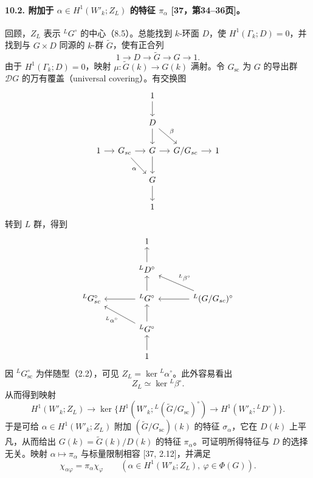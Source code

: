 \paragraph*{10.2. 附加于 $\alpha\in H^1(W'_k;Z_L)$ 的特征 $\pi_\alpha$ [37，第34--36页]。}
回顾，$Z_L$ 表示 ${}^LG^\circ$ 的中心（8.5）。总能找到 $k$-环面 $D$，使 $H^1(\Gamma_k;D)=0$，并找到与 $G\times D$ 同源的 $k$-群 $\widetilde G$，使有正合列
\begin{equation}
 1\longrightarrow D\longrightarrow\widetilde G\longrightarrow G\longrightarrow1.\tag{1}
\end{equation}
由于 $H^1(\Gamma_k;D)=0$，映射 $\mu:\widetilde G(k)\to G(k)$ 满射。令 $G_{\mathrm{sc}}$ 为 $G$ 的导出群 $\mathcal DG$ 的万有覆盖（universal covering）。有交换图
\[
\begin{tikzcd}[column sep=small]
 &&1\arrow[d]&&\\
 &&D\arrow[d]\arrow[dr,"\beta"]&&\\
 1\arrow[r]&G_{\mathrm{sc}}\arrow[r]\arrow[dr,"\alpha"']&\widetilde G\arrow[r]\arrow[d]&\widetilde G/G_{\mathrm{sc}}\arrow[r]&1\\
 &&G\arrow[d]&&\\
 &&1&&
\end{tikzcd}
\]
转到 $L$ 群，得到
\[
\begin{tikzcd}[column sep=large]
 &1&\\
 &{}^LD^\circ\arrow[u]&\\
 {}^LG_{\mathrm{sc}}^\circ&{}^L\widetilde G^\circ\arrow[l]\arrow[u]&{}^L(\widetilde G/G_{\mathrm{sc}})^\circ\arrow[l]\arrow[ul,"{}^L\beta^\circ"']\\
 &{}^LG^\circ\arrow[u]\arrow[ul,"{}^L\alpha^\circ"]&\\
 &1\arrow[u]&
\end{tikzcd}
\]
因 ${}^LG_{\mathrm{sc}}^\circ$ 为伴随型（2.2），可见 $Z_L=\ker{}^L\alpha^\circ$。此外容易看出
\begin{equation}
 Z_L\simeq\ker{}^L\beta^\circ.\tag{2}
\end{equation}
从而得到映射
\begin{equation}
 H^1(W'_k;Z_L)\longrightarrow
 \ker\{H^1(W'_k;{}^L(\widetilde G/G_{\mathrm{sc}})^\circ)
 \longrightarrow H^1(W'_k;{}^LD^\circ)\}.\tag{3}
\end{equation}
于是可给 $\alpha\in H^1(W'_k;Z_L)$ 附加 $(\widetilde G/G_{\mathrm{sc}})(k)$ 的特征 $\sigma_\alpha$，它在 $D(k)$ 上平凡，从而给出 $G(k)=\widetilde G(k)/D(k)$ 的特征 $\pi_\alpha$。可证明所得特征与 $D$ 的选择无关。映射 $\alpha\mapsto\pi_\alpha$ 与标量限制相容 [37, 2.12]，并满足
\begin{equation}
 \chi_{\alpha\varphi}=\pi_\alpha\chi_\varphi
 \qquad(\alpha\in H^1(W'_k;Z_L),\ \varphi\in\Phi(G)).\tag{4}
\end{equation}


